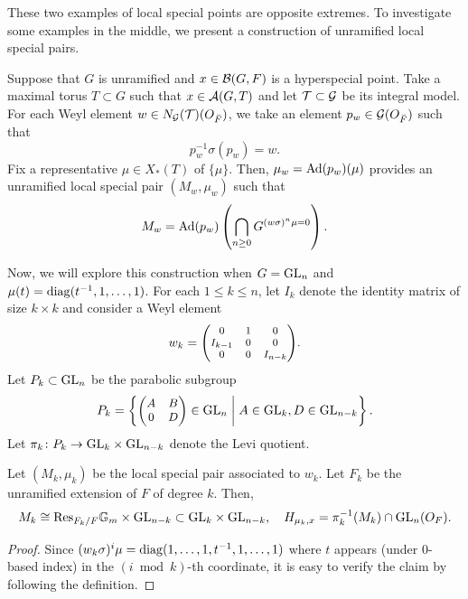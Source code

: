 \documentclass[12pt,reqno]{amsart}
\begin{document}
These two examples of local special points are opposite extremes. To investigate some examples in the middle, we present a construction of unramified local special pairs. 

\begin{const} \label{const:special_pair_from_Weyl_element}
    Suppose that $G$ is unramified and $x \in {\mathcal{B}}(G, F)$ is a hyperspecial point. Take a maximal torus $T \subset G$ such that $x \in {\mathcal{A}}(G, T)$ and let ${\mathcal{T}} \subset {\mathcal{G}}$ be its integral model. For each Weyl element $w \in N_{{\mathcal{G}}}({\mathcal{T}})(O_{\breve{F}})$, we take an element $p_w \in {\mathcal{G}}(O_{\breve{F}})$ such that 
    \[  
        p_w^{-1} \sigma(p_w) = w. 
    \]  
    Fix a representative $\mu \in X_*(T)$ of $\{ \mu \}$. Then, $\mu_w = {\operatorname{Ad}}(p_w)(\mu)$ provides an unramified local special pair $(M_w, \mu_w)$ such that 
    \[
        M_w = {\operatorname{Ad}}(p_w)\left( \bigcap_{n \geq 0} G^{(w\sigma)^n \mu = 0} \right). 
    \]
\end{const}

Now, we will explore this construction when $G = {\operatorname{GL}}_n$ and $\mu(t) = {\operatorname{diag}}(t^{-1}, 1, \ldots, 1)$. For each $1 \leq k \leq n$, let $I_k$ denote the identity matrix of size $k \times k$ and consider a Weyl element
\[
    w_k = {\footnotesize \begin{pmatrix}
        0 & 1 & 0 \\
        I_{k-1} & 0 & 0 \\
        0 & 0 & I_{n-k}
    \end{pmatrix}}. 
\]
Let $P_k \subset {\operatorname{GL}}_n$ be the parabolic subgroup
\[
    P_k = \left\{ {\small \begin{pmatrix}
        A & B \\
        0 & D
    \end{pmatrix}} \in {\operatorname{GL}}_n \; \bigg\vert \; A \in {\operatorname{GL}}_k, D \in {\operatorname{GL}}_{n-k}
    \right\}. 
\]
Let $\pi_k \colon P_k \to {\operatorname{GL}}_k \times {\operatorname{GL}}_{n-k}$ denote the Levi quotient. 
\begin{lem}
    Let $(M_k, \mu_k)$ be the local special pair associated to $w_k$. Let $F_k$ be the unramified extension of $F$ of degree $k$. Then, 
    \[
        M_k \cong {\operatorname{Res}}_{F_k / F} \mathbb{G}_m \times {\operatorname{GL}}_{n-k} \subset {\operatorname{GL}}_k \times {\operatorname{GL}}_{n-k} ,\quad H_{\mu_k, x} = \pi_k^{-1}(M_k) \cap {\operatorname{GL}}_n(O_F). 
    \]
\end{lem}
\begin{proof}
    Since $(w_k\sigma)^i \mu = {\operatorname{diag}}(1, \ldots, 1, t^{-1}, 1, \ldots, 1)$ where $t$ appears (under $0$-based index) in the $(i \bmod k)$-th coordinate, it is easy to verify the claim by following the definition. 
\end{proof}
\end{document}
